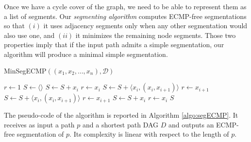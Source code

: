 % 
% 

Once we have a cycle cover of the graph, we need to be able to represent them as
a list of segments. Our \textit{segmenting algorithm} computes ECMP-free
segmentations so that $(i)$ it uses adjacency segments only when any other
segmentation would also use one, and $(ii)$ it minimizes the remaining node
segments. Those two properties imply that if the input path admits a simple
segmentation, our algorithm will produce a minimal simple segmentation.
\begin{algorithm}
\small
\caption{\textsf{MinSegECMP}$((x_1, x_2, \ldots, x_n), \mathcal{D})$}
\begin{algorithmic}[1]
\STATE $r \gets 1$
\STATE $S \gets \langle \rangle$
      \STATE $S \gets S + x_i$
      \STATE $r \gets x_i$
   \ELSE
      \STATE $S \gets S + \langle x_i, (x_i, x_{i + 1}) \rangle$
      \STATE $r \gets x_{i + 1}$
   \ENDIF
     \STATE $S \gets S + \langle x_i, (x_i, x_{i + 1}) \rangle$
     \STATE $r \gets x_{i + 1}$
   \ELSE
     \STATE $S \gets S + x_i$
     \STATE $r \gets x_i$
   \ENDIF
 \ENDIF
\ENDFOR
\RETURN $S$
\end{algorithmic}
\label{algo:segECMP}
\end{algorithm}

The pseudo-code of the algorithm is reported in Algorithm \ref{algo:segECMP}. It
receives as input a path $p$ and a shortest path DAG $D$ and outputs an
ECMP-free segmentation of $p$. Its complexity is linear with respect to the
length of $p$.

